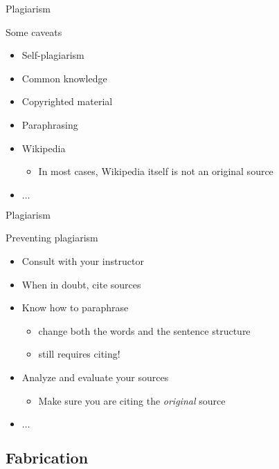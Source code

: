 		\begin{frame}{Plagiarism}
			
			Some caveats

			\begin{itemize}
				\item 
					Self-plagiarism
				\item 
					Common knowledge
				\item 
					Copyrighted material
				\item 
					Paraphrasing
				\item 
					Wikipedia
					\begin{itemize}
						\item 
							In most cases, Wikipedia itself is not an original source
					\end{itemize}
				\item 
					$\ldots$
			\end{itemize}

		\end{frame}

		\begin{frame}{Plagiarism}
			
			Preventing plagiarism

			\begin{itemize}
				\item 
					Consult with your instructor
				\item 
					When in doubt, cite sources
				\item 
					Know how to paraphrase
					\begin{itemize}
						\item 
							change both the words and the sentence structure
						\item 
							still requires citing!
					\end{itemize}
				\item 
					Analyze and evaluate your sources
					\begin{itemize}
						\item 
							Make sure you are citing the \emph{original} source
					\end{itemize}
				\item 
					$\ldots$
			\end{itemize}

		\end{frame}

	\subsection{Fabrication}

